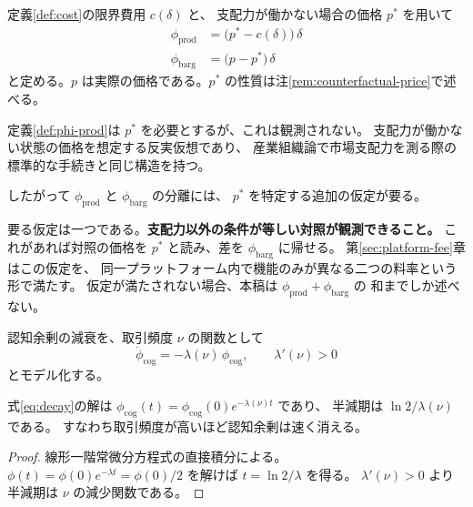 \begin{definition}[生産余剰と交渉余剰]
\label{def:phi-prod}
定義\ref{def:cost}の限界費用 $c(\delta)$ と、
支配力が働かない場合の価格 $p^{\ast}$ を用いて
\begin{align}
\phi_{\mathrm{prod}} &= \bigl(p^{\ast} - c(\delta)\bigr)\,\delta \\
\phi_{\mathrm{barg}} &= \bigl(p - p^{\ast}\bigr)\,\delta
\end{align}
と定める。$p$ は実際の価格である。$p^{\ast}$ の性質は注\ref{rem:counterfactual-price}で述べる。
\end{definition}

\begin{remark}
\label{rem:counterfactual-price}
定義\ref{def:phi-prod}は $p^{\ast}$ を必要とするが、これは観測されない。
支配力が働かない状態の価格を想定する反実仮想であり、
産業組織論で市場支配力を測る際の標準的な手続きと同じ構造を持つ。

したがって $\phi_{\mathrm{prod}}$ と $\phi_{\mathrm{barg}}$ の分離には、
$p^{\ast}$ を特定する追加の仮定が要る。

要る仮定は一つである。\textbf{支配力以外の条件が等しい対照が観測できること。}
これがあれば対照の価格を $p^{\ast}$ と読み、差を $\phi_{\mathrm{barg}}$ に帰せる。
第\ref{sec:platform-fee}章はこの仮定を、
同一プラットフォーム内で機能のみが異なる二つの料率という形で満たす。
仮定が満たされない場合、本稿は $\phi_{\mathrm{prod}}+\phi_{\mathrm{barg}}$ の
和までしか述べない。
\end{remark}

認知余剰の減衰を、取引頻度 $\nu$ の関数として
\begin{equation}
\dot{\phi}_{\mathrm{cog}} = -\lambda(\nu)\,\phi_{\mathrm{cog}},
\qquad \lambda'(\nu)>0
\label{eq:decay}
\end{equation}
とモデル化する。

\begin{proposition}[減衰の含意]
式\eqref{eq:decay}の解は $\phi_{\mathrm{cog}}(t)=\phi_{\mathrm{cog}}(0)e^{-\lambda(\nu)t}$ であり、
半減期は $\ln 2/\lambda(\nu)$ である。
すなわち取引頻度が高いほど認知余剰は速く消える。
\end{proposition}

\begin{proof}
線形一階常微分方程式の直接積分による。
$\phi(t)=\phi(0)e^{-\lambda t}=\phi(0)/2$ を解けば $t=\ln 2/\lambda$ を得る。
$\lambda'(\nu)>0$ より半減期は $\nu$ の減少関数である。
\end{proof}

